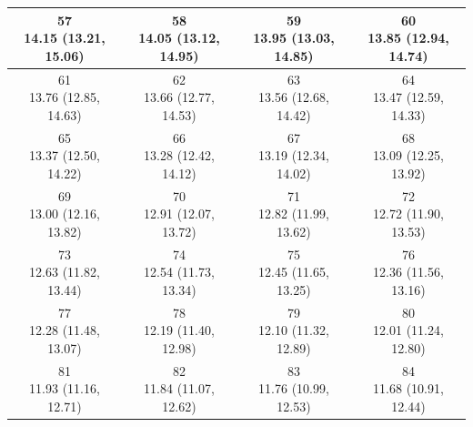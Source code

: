 \begin{table}[htbp]
\begin{tabular}{cccc}
\hline
\shortstack[c]{57\\14.15 (13.21, 15.06)} & \shortstack[c]{58\\14.05 (13.12, 14.95)} & \shortstack[c]{59\\13.95 (13.03, 14.85)} & \shortstack[c]{60\\13.85 (12.94, 14.74)} \\
\hline
\shortstack[c]{61\\13.76 (12.85, 14.63)} & \shortstack[c]{62\\13.66 (12.77, 14.53)} & \shortstack[c]{63\\13.56 (12.68, 14.42)} & \shortstack[c]{64\\13.47 (12.59, 14.33)} \\
\hline
\shortstack[c]{65\\13.37 (12.50, 14.22)} & \shortstack[c]{66\\13.28 (12.42, 14.12)} & \shortstack[c]{67\\13.19 (12.34, 14.02)} & \shortstack[c]{68\\13.09 (12.25, 13.92)} \\
\hline
\shortstack[c]{69\\13.00 (12.16, 13.82)} & \shortstack[c]{70\\12.91 (12.07, 13.72)} & \shortstack[c]{71\\12.82 (11.99, 13.62)} & \shortstack[c]{72\\12.72 (11.90, 13.53)} \\
\hline
\shortstack[c]{73\\12.63 (11.82, 13.44)} & \shortstack[c]{74\\12.54 (11.73, 13.34)} & \shortstack[c]{75\\12.45 (11.65, 13.25)} & \shortstack[c]{76\\12.36 (11.56, 13.16)} \\
\hline
\shortstack[c]{77\\12.28 (11.48, 13.07)} & \shortstack[c]{78\\12.19 (11.40, 12.98)} & \shortstack[c]{79\\12.10 (11.32, 12.89)} & \shortstack[c]{80\\12.01 (11.24, 12.80)} \\
\hline
\shortstack[c]{81\\11.93 (11.16, 12.71)} & \shortstack[c]{82\\11.84 (11.07, 12.62)} & \shortstack[c]{83\\11.76 (10.99, 12.53)} & \shortstack[c]{84\\11.68 (10.91, 12.44)} \\

\end{tabular}
\end{table}
